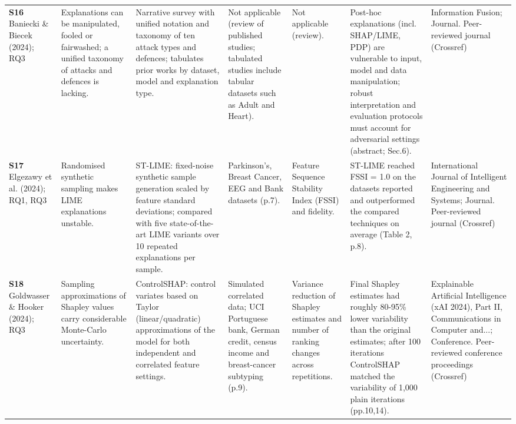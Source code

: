 \begin{longtable}{@{}P{1.55cm}P{2.9cm}P{4.5cm}P{3.2cm}P{3.4cm}P{4.6cm}P{3.6cm}@{}}
\textbf{S16} \cite{S16} Baniecki \& Biecek (2024); RQ3 & Explanations can be manipulated, fooled or fairwashed; a unified taxonomy of attacks and defences is lacking. & Narrative survey with unified notation and taxonomy of ten attack types and defences; tabulates prior works by dataset, model and explanation type. & Not applicable (review of published studies; tabulated studies include tabular datasets such as Adult and Heart). & Not applicable (review). & Post-hoc explanations (incl. SHAP/\allowbreak{}LIME, PDP) are vulnerable to input, model and data manipulation; robust interpretation and evaluation protocols must account for adversarial settings (abstract; Sec.6). & Information Fusion; Journal. Peer-reviewed journal (Crossref) \\
\textbf{S17} \cite{S17} Elgezawy et al. (2024); RQ1, RQ3 & Randomised synthetic sampling makes LIME explanations unstable. & ST-LIME: fixed-noise synthetic sample generation scaled by feature standard deviations; compared with five state-of-the-art LIME variants over 10 repeated explanations per sample. & Parkinson's, Breast Cancer, EEG and Bank datasets (p.7). & Feature Sequence Stability Index (FSSI) and fidelity. & ST-LIME reached FSSI = 1.0 on the datasets reported and outperformed the compared techniques on average (Table 2, p.8). & International Journal of Intelligent Engineering and Systems; Journal. Peer-reviewed journal (Crossref) \\
\textbf{S18} \cite{S18} Goldwasser \& Hooker (2024); RQ3 & Sampling approximations of Shapley values carry considerable Monte-Carlo uncertainty. & ControlSHAP: control variates based on Taylor (linear/\allowbreak{}quadratic) approximations of the model for both independent and correlated feature settings. & Simulated correlated data; UCI Portuguese bank, German credit, census income and breast-cancer subtyping (p.9). & Variance reduction of Shapley estimates and number of ranking changes across repetitions. & Final Shapley estimates had roughly 80-95\% lower variability than the original estimates; after 100 iterations ControlSHAP matched the variability of 1,000 plain iterations (pp.10,14). & Explainable Artificial Intelligence (xAI 2024), Part II, Communications in Computer and...; Conference. Peer-reviewed conference proceedings (Crossref) \\

\end{longtable}
